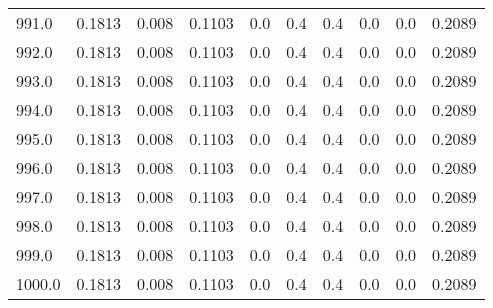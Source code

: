 \begin{longtable}{lrrrrrrrrr}
991.0 & 0.1813 & 0.008 & 0.1103 & 0.0 & 0.4 & 0.4 & 0.0 & 0.0 & 0.2089 \\
992.0 & 0.1813 & 0.008 & 0.1103 & 0.0 & 0.4 & 0.4 & 0.0 & 0.0 & 0.2089 \\
993.0 & 0.1813 & 0.008 & 0.1103 & 0.0 & 0.4 & 0.4 & 0.0 & 0.0 & 0.2089 \\
994.0 & 0.1813 & 0.008 & 0.1103 & 0.0 & 0.4 & 0.4 & 0.0 & 0.0 & 0.2089 \\
995.0 & 0.1813 & 0.008 & 0.1103 & 0.0 & 0.4 & 0.4 & 0.0 & 0.0 & 0.2089 \\
996.0 & 0.1813 & 0.008 & 0.1103 & 0.0 & 0.4 & 0.4 & 0.0 & 0.0 & 0.2089 \\
997.0 & 0.1813 & 0.008 & 0.1103 & 0.0 & 0.4 & 0.4 & 0.0 & 0.0 & 0.2089 \\
998.0 & 0.1813 & 0.008 & 0.1103 & 0.0 & 0.4 & 0.4 & 0.0 & 0.0 & 0.2089 \\
999.0 & 0.1813 & 0.008 & 0.1103 & 0.0 & 0.4 & 0.4 & 0.0 & 0.0 & 0.2089 \\
1000.0 & 0.1813 & 0.008 & 0.1103 & 0.0 & 0.4 & 0.4 & 0.0 & 0.0 & 0.2089 \\
\end{longtable}
